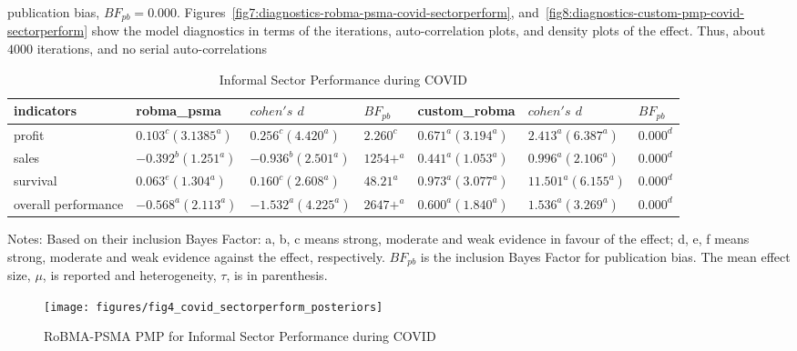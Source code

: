 \documentclass[12pt, english]{article}
\begin{document}
publication bias, $BF_{pb} = 0.000$. Figures~\ref{fig7:diagnostics-robma-psma-covid-sectorperform}, and~\ref{fig8:diagnostics-custom-pmp-covid-sectorperform} show the model diagnostics in terms of the iterations, auto-correlation plots, and density plots of the effect. Thus, about $4000$ iterations, and no serial auto-correlations

    \begin{landscape}
        \begin{table}
            \centering
            \caption{Informal Sector Performance during COVID}
            \label{tab4:informal-sector-perform-during-covid}
            \begin{tabular}{lllllll}
                \toprule
                indicators          & robma\_psma          & $cohen's$ $d$        & $BF_{pb}$ & custom\_robma       & $cohen's$ $d$        & $BF_{pb}$ \\
                \midrule
                profit              & $0.103^c (3.1385^a)$ & $0.256^c (4.420^a)$  & $2.260^c$ & $0.671^a (3.194^a)$ & $2.413^a (6.387^a)$ & $0.000^d$ \\
                sales               & $-0.392^b (1.251^a)$ & $-0.936^b (2.501^a)$ & $1254+^a$ & $0.441^a (1.053^a)$ & $0.996^a (2.106^a)$ & $0.000^d$ \\
                survival            & $0.063^e (1.304^a)$  & $0.160^c (2.608^a)$  & $48.21^a$ & $0.973^a (3.077^a)$ & $11.501^a (6.155^a)$ & $0.000^d$ \\
                overall performance & $-0.568^a (2.113^a)$ & $-1.532^a (4.225^a)$ & $2647+^a$ & $0.600^a (1.840^a)$ & $1.536^a (3.269^a)$ & $0.000^d$ \\
                \bottomrule
            \end{tabular}
            \begin{minipage}{19cm}
                \vspace{0.1cm}
                \small Notes: Based on their inclusion Bayes Factor: a, b, c means strong, moderate and weak evidence in favour of the effect; d, e, f means strong, moderate and weak evidence against the effect, respectively. $BF_{pb}$ is the inclusion Bayes Factor for publication bias. The mean effect size, $\mu$, is reported and heterogeneity, $\tau$, is in parenthesis.
            \end{minipage}
        \end{table}
    \end{landscape}

    \begin{figure}[H]
        \centering
        \texttt{[image: figures/fig4\_covid\_sectorperform\_posteriors]}
        \caption{RoBMA-PSMA PMP for Informal Sector Performance during COVID}
        \label{fig5:robma-psma-pmp-covid-sectorperform-posteriors}
    \end{figure}
\end{document}
